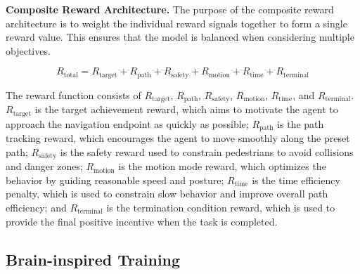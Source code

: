\documentclass[lettersize,journal]{IEEEtran}
\begin{document}
\textbf{Composite Reward Architecture.}
%
The purpose of the composite reward architecture is to weight the individual reward signals together to form a single reward value. 
This ensures that the model is balanced when considering multiple objectives.

\begin{equation}
	R_{\text{total}} = R_{\text{target}} + R_{\text{path}} + R_{\text{safety}} + R_{\text{motion}} + R_{\text{time}} + R_{\text{terminal}}
\end{equation}

The reward function consists of \( R_{\text{target}} \), \( R_{\text{path}} \), \( R_{\text{safety}} \), \( R_{\text{motion}} \), \( R_{\text{time}} \), and \( R_{\text{terminal}} \). 
\( R_{\text{target}} \) is the target achievement reward, which aims to motivate the agent to approach the navigation endpoint as quickly as possible; 
\( R_{\text{path}} \) is the path tracking reward, which encourages the agent to move smoothly along the preset path; 
\( R_{\text{safety}} \) is the safety reward used to constrain pedestrians to avoid collisions and danger zones; 
\( R_{\text{motion}} \) is the motion mode reward, which optimizes the behavior by guiding reasonable speed and posture; 
\( R_{\text{time}} \) is the time efficiency penalty, which is used to constrain slow behavior and improve overall path efficiency; 
and \( R_{\text{terminal}} \) is the termination condition reward, which is used to provide the final positive incentive when the task is completed.






\subsection{Brain-inspired Training}




\end{document}
